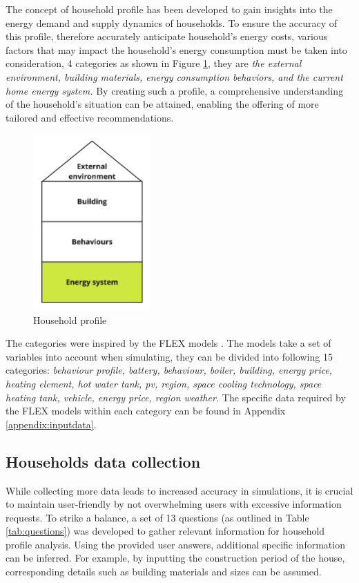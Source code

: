 The concept of household profile has been developed to gain insights into the energy demand and supply dynamics of households. 
To ensure the accuracy of this profile, therefore accurately anticipate household's energy costs, 
various factors that may impact the household's energy consumption must be taken into consideration, 4 categories as shown in Figure \ref{fig:profile}, they are 
\emph{the external environment, building materials, energy consumption behaviors, and the current home energy system.}
By creating such a profile, a comprehensive understanding of the household's situation can be attained, enabling the offering of more tailored and effective recommendations.
\begin{figure}[h]
  \centering
  \includegraphics[width=0.4\textwidth]{Images/household_profile.jpg}
  \caption{Household profile}
  \label{fig:profile}
\end{figure}

The categories were inspired by the FLEX models \cite{newtrends}.
The models take a set of variables into account when simulating, they can be divided into following 15 categories: 
\emph{
    behaviour profile,
    battery,
    behaviour, 
    boiler,
    building,
    energy price,
    heating element, 
    hot water tank,
    \gls{pv},
    region,
    space cooling technology,
    space heating tank,
    vehicle,
    energy price,
    region weather. 
}
The specific data required by the FLEX models within each category can be found in Appendix \ref{appendix:inputdata}. 


\subsection{Households data collection}

While collecting more data leads to increased accuracy in simulations, it is crucial to maintain user-friendly by not overwhelming users with excessive information requests. 
To strike a balance, a set of 13 questions (as outlined in Table \ref{tab:questions}) was developed to gather relevant information for household profile analysis. 
Using the provided user answers, additional specific information can be inferred. 
For example, by inputting the construction period of the house, corresponding details such as building materials and sizes can be assumed. 

